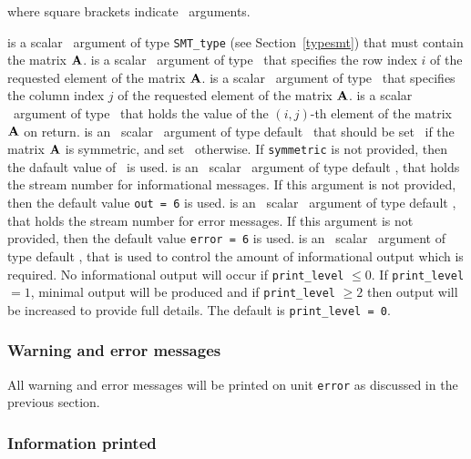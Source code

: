 \documentclass{galahad}
\begin{document}
\vspace*{1mm}
\noindent where square brackets indicate \optional\ arguments. 
\vspace*{0mm}
\begin{description}
   is a scalar \intentin\ argument of type {\tt SMT\_type} (see
     Section~\ref{typesmt}) that must contain the matrix ${\mathbf{A}}$.
   is a scalar \intentin\ argument of type \integer\ that
     specifies the row index $i$ of the requested element of the
     matrix ${\mathbf{A}}$.
   is a scalar \intentin\ argument of type \integer\ that
     specifies the column index $j$ of the requested element of the
     matrix ${\mathbf{A}}$.
   is a scalar \intentout\ argument of type \realdp\ that
     holds the value of the $(i,j)$-th element of the matrix ${\mathbf{A}}$ on return.
   is an \optional\ scalar \intentin\ argument of type default
     \logical\ that should be set \true\ if the matrix ${\mathbf{A}}$ is
     symmetric, and set \false\ otherwise.  If {\tt symmetric} is not
     provided, then the dafault value of \false\ is used. 
   is an \optional\ scalar \intentin\ argument of type default \integer, that holds the
     stream number for informational messages. If this argument is not
     provided, then the default value {\tt out = 6} is used.
   is an \optional\ scalar \intentin\ argument of type default \integer, that holds the
     stream number for error messages. If this argument is not
     provided, then the default value {\tt error = 6} is used.
   is an \optional\ scalar \intentin\ argument of type default \integer, that is used
     to control the amount of informational output which is required. No 
     informational output will occur if {\tt print\_level} $\leq 0$. If 
     {\tt print\_level} $= 1$, minimal output will be produced and if
     {\tt print\_level} $\geq 2$ then output will be
     increased to provide full details.
     The default is {\tt print\_level = 0}.
\end{description}

\subsubsection{Warning and error messages}\label{getval-error}

All warning and error messages will be printed on unit {\tt error} as
discussed in the previous section.

\subsubsection{Information printed}\label{getval-info}
\end{document}
